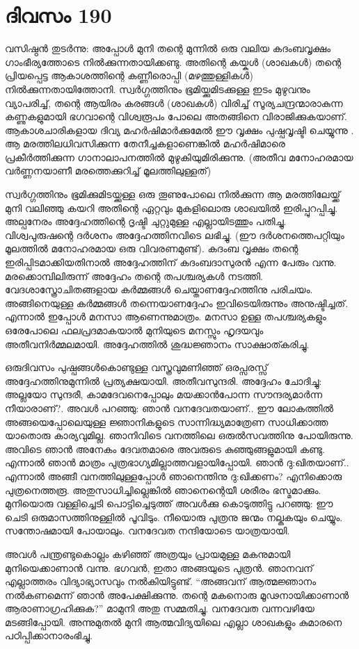 \section{ദിവസം 190}


വസിഷ്ഠൻ തുടർന്നു: അപ്പോൾ മുനി തന്റെ മുന്നിൽ ഒരു വലിയ കദംബവൃക്ഷം ഗാംഭീര്യത്തോടെ നില്‍ക്കുന്നതായിക്കണ്ടു. അതിന്റെ കയ്കൾ (ശാഖകൾ) തന്റെ പ്രിയപ്പെട്ട ആകാശത്തിന്റെ കണ്ണീരൊപ്പി (മഴത്തുള്ളികൾ) നിൽക്കുന്നതായിത്തോനി. സ്വർഗ്ഗത്തിനും ഭൂമിയ്ക്കുമിടക്കുള്ള ഇടം മുഴുവനും വ്യാപരിച്ച്, തന്റെ ആയിരം കരങ്ങൾ (ശാഖകൾ) വിരിച്ച് സൂര്യചന്ദ്രന്മാരാകുന്ന കണ്ണുകളുമായി ഭഗവാന്റെ വിശ്വരൂപം പോലെ  അതങ്ങിനെ വിരാജിക്കുകയാണ്‌.  ആകാശചാരികളായ ദിവ്യ മഹർഷിമാർക്കുമേൽ ഈ വൃക്ഷം പുഷ്പവൃഷ്ടി ചെയ്യുന്നു . ആ മരത്തിലധിവസിക്കുന്ന തേനീച്ചകളാണെങ്കിൽ മഹർഷിമാരെ പ്രകീർത്തിക്കുന്ന ഗാനാലാപനത്തിൽ മുഴുകിയുമിരിക്കുന്നു. (അതീവ മനോഹരമായ വർണ്ണനയാണീ മരത്തെക്കുറിച്ച് മൂലത്തിലുള്ളത്)

സ്വർഗ്ഗത്തിനും ഭൂമിക്കുമിടയ്ക്കുള്ള ഒരു തൂണുപോലെ നില്‍ക്കുന്ന ആ മരത്തിലേയ്ക്ക് മുനി വലിഞ്ഞു കയറി അതിന്റെ ഏറ്റവും മുകളിലൊരു ശാഖയിൽ ഇരിപ്പുറപ്പിച്ചു. അല്പനേരം അദ്ദേഹത്തിന്റെ ദൃഷ്ടി ചുറ്റുമുള്ള എല്ലായിടത്തും പതിച്ചു. വിശ്വപുരുഷന്റെ ദർശനം അദ്ദേഹത്തിനവിടെ ലഭിച്ചു. (ഈ ദർശനത്തെപറ്റിയും മൂലത്തിൽ മനോഹരമായ ഒരു വിവരണമുണ്ട്). കദംബ വൃക്ഷം തന്റെ ഇരിപ്പിടമാക്കിയതിനാൽ അദ്ദേഹത്തിന്‌ കദംബദാസുരൻ എന്ന പേരും വന്നു. മരക്കൊമ്പിലിരുന്ന് അദ്ദേഹം തന്റെ തപശ്ചര്യകൾ നടത്തി. വേദശാസ്ത്രോചിതങ്ങളായ കർമ്മങ്ങൾ ചെയ്താണദ്ദേഹത്തിനു പരിചയം. അങ്ങിനെയുള്ള കർമ്മങ്ങൾ തന്നെയാണദ്ദേഹം ഇവിടെയിരുന്നും അനുഷ്ടിച്ചത്. എന്നാൽ ഇപ്പോൾ മനസാ ആണെന്നുമാത്രം. മനസാ ഉള്ള തപശ്ചര്യകളും ഒരേപോലെ ഫലപ്രദമാകയാൽ മുനിയുടെ മനസ്സും ഹൃദയവും അതീവനിർമ്മലമായി. അദ്ദേഹത്തില്‍ ശുദ്ധജ്ഞാനം സാക്ഷാത്കരിച്ചു.

ഒരുദിവസം പുഷ്പങ്ങൾകൊണ്ടുള്ള വസ്ത്രവുമണിഞ്ഞ് ഒരപ്സരസ്സ് അദ്ദേഹത്തിനുമുന്നിൽ പ്രത്യക്ഷയായി. അതീവസുന്ദരി. അദ്ദേഹം ചോദിച്ചു: അല്ലയോ സുന്ദരീ, കാമദേവനെപ്പോലും മയക്കാൻപോന്ന സൗന്ദര്യമാർന്ന നീയാരാണ്‌?. അവൾ പറഞ്ഞു: ഞാൻ വനദേവതയാണ്‌.. ഈ ലോകത്തിൽ അങ്ങയെപ്പോലെയുള്ള ജ്ഞാനികളുടെ സാന്നിദ്ധ്യമാത്രേണ സാധിക്കാത്ത യാതൊരു കാര്യവുമില്ല. ഞാനിവിടെ വനത്തിലെ ഒരുൽസവത്തിനു പോയിരുന്നു. അവിടെ ഞാൻ അനേകം ദേവതമാരെ അവരുടെ കുഞ്ഞുങ്ങളുമായി കണ്ടു. എന്നാൽ ഞാൻ മാത്രം പുത്രഭാഗ്യമില്ലാത്തവളായിപ്പോയി. ഞാൻ ദു:ഖിതയാണ്‌.. എന്നാൽ അങ്ങീ വനത്തിലുള്ളപ്പോൾ ഞാനെന്തിനു ദു:ഖിക്കണം? എനിക്കൊരു പുത്രനെത്തരൂ. അതുസാധിച്ചില്ലെങ്കിൽ ഞാനെന്റെയീ ശരീരം ഭസ്മമാക്കും. മുനിയൊരു വള്ളിച്ചെടി പൊട്ടിച്ചെടുത്ത് അവൾക്കു കൊടുത്തിട്ടു പറഞ്ഞു: ഈ ചെടി ഒരുമാസത്തിനുള്ളിൽ പൂവിടും. നീയൊരു പുത്രനു ജന്മം നല്കുകയും ചെയ്യും. സന്തോഷമായി പോയാലും. വനദേവത നന്ദിയോടെ യാത്രയായി.

അവൾ പന്ത്രണ്ടുകൊല്ലം കഴിഞ്ഞ് അത്രയും പ്രായമുള്ള മകനുമായി മുനിയെക്കാണാൻ വന്നു. ഭഗവൻ, ഇതാ അങ്ങയുടെ പുത്രൻ. ഞാനവന്‌ എല്ലാത്തരം വിദ്യാഭ്യാസവും നൽകിയിട്ടുണ്ട്. “അങ്ങവന്‌ ആത്മജ്ഞാനം നൽകണമെന്ന് ഞാൻ അപേക്ഷിക്കുന്നു. തന്റെ മകനൊരു മൂഢനായിക്കാണാൻ ആരാണാഗ്രഹിക്കുക?” മാമുനി അതു സമ്മതിച്ചു. വനദേവത വന്നവഴിയേ  മടങ്ങിപ്പോയി. അന്നുമുതൽ മുനി ആത്മവിദ്യയിലെ എല്ലാ ശാഖകളും കുമാരനെ പഠിപ്പിക്കാനാരംഭിച്ചു. 
